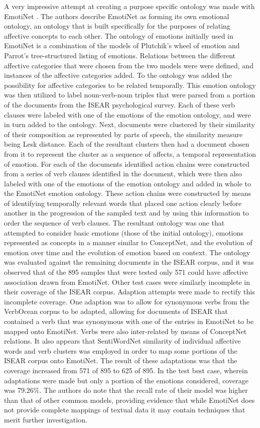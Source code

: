 \documentclass[letterpaper, 10 pt, conference]{ieeeconf}
\begin{document}
A very impressive attempt at creating a purpose specific ontology was made with EmotiNet \textcolor{gray}{\cite{Balahur}}. The authors describe EmotiNet as forming its own emotional ontology, an ontology that is built specifically for the purposes of relating affective concepts to each other. The ontology of emotions initially used in EmotiNet is a combination of the models of Plutchik's wheel of emotion and Parrot's tree-structured listing of emotions. Relations between the different affective categories that were chosen from the two models were were defined, and instances of the affective categories added. To the ontology was added the possibility for affective categories to be related temporally. This emotion ontology was then utilized to label noun-verb-noun triples that were parsed from a portion of the documents from the ISEAR psychological survey. Each of these verb clauses were labeled with one of the emotions of the emotion ontology, and were in turn added to the ontology. Next, documents were clustered by their similarity of their composition as represented by parts of speech, the similarity measure being Lesk distance. Each of the resultant clusters then had a document chosen from it to represent the cluster as a sequence of affects, a temporal representation of emotion. For each of the documents identified action chains were constructed from a series of verb clauses identified in the document, which were then also labeled with one of the emotions of the emotion ontology and added in whole to the EmotiNet emotion ontology. These action chains were constructed by means of identifying temporally relevant words that placed one action clearly before another in the progression of the sampled text and by using this information to order the sequence of verb clauses. The resultant ontology was one that attempted to consider basic emotions (those of the initial ontology), emotions represented as concepts in a manner similar to ConceptNet, and the evolution of emotion over time and the evolution of emotion based on context. The ontology was evaluated against the remaining documents in the ISEAR corpus, and it was observed that of the 895 samples that were tested only 571 could have affective association drawn from EmotiNet. Other test cases were similarly incomplete in their coverage of the ISEAR corpus. Adaption attempts were made to rectify this incomplete coverage. One adaption was to allow for synonymous verbs from the VerbOcean corpus to be adapted, allowing for documents of ISEAR that contained a verb that was synonymous with one of the entries in EmotiNet to be mapped onto EmotiNet. Verbs were also inter-related by means of ConceptNet relations. It also appears that SentiWordNet similarity of individual affective words and verb clusters was employed in order to map some portions of the ISEAR corpus onto EmotiNet. The result of these adaptations was that the coverage increased from 571 of 895 to 625 of 895. In the test best case, wherein adaptations were made but only a portion of the emotions considered, coverage was $79.26\%$. The authors do note that the recall rate of their model was higher than that of other common models, providing evidence that while EmotiNet does not provide complete mappings of textual data it may contain techniques that merit further investigation.
\end{document}
